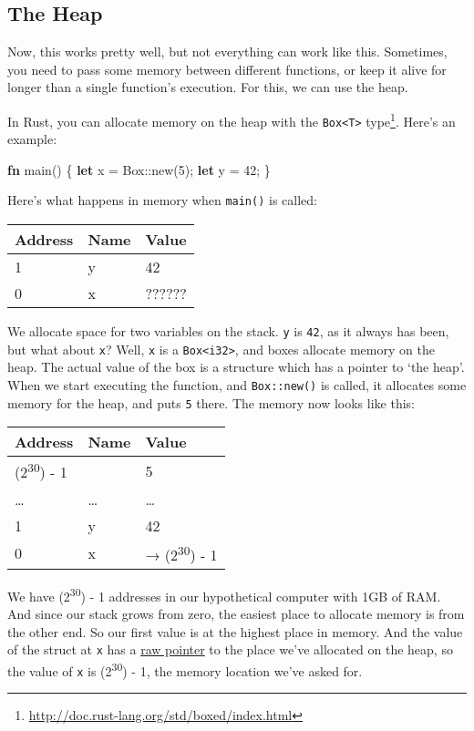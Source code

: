 \documentclass[a4paper,]{book}
\newenvironment{Shaded}{\begin{snugshade}}{\end{snugshade}}
\newcommand{\KeywordTok}[1]{\textcolor[rgb]{0.13,0.29,0.53}{\textbf{{#1}}}}
\newcommand{\DataTypeTok}[1]{\textcolor[rgb]{0.13,0.29,0.53}{{#1}}}
\newcommand{\DecValTok}[1]{\textcolor[rgb]{0.00,0.00,0.81}{{#1}}}
\newcommand{\NormalTok}[1]{{#1}}
\renewcommand{\href}[2]{#2\footnote{\url{#1}}}
\begin{document}
\subsection{The Heap}\label{the-heap}

Now, this works pretty well, but not everything can work like this.
Sometimes, you need to pass some memory between different functions, or
keep it alive for longer than a single function's execution. For this,
we can use the heap.

In Rust, you can allocate memory on the heap with the
\href{http://doc.rust-lang.org/std/boxed/index.html}{\texttt{Box\textless{}T\textgreater{}}
type}. Here's an example:

\begin{Shaded}
\begin{Highlighting}[]
\KeywordTok{fn} \NormalTok{main() \{}
    \KeywordTok{let} \NormalTok{x = }\DataTypeTok{Box}\NormalTok{::new(}\DecValTok{5}\NormalTok{);}
    \KeywordTok{let} \NormalTok{y = }\DecValTok{42}\NormalTok{;}
\NormalTok{\}}
\end{Highlighting}
\end{Shaded}

Here's what happens in memory when \texttt{main()} is called:

\begin{longtable}[c]{@{}lll@{}}
\toprule
Address & Name & Value\tabularnewline
\midrule
\endhead
1 & y & 42\tabularnewline
0 & x & ??????\tabularnewline
\bottomrule
\end{longtable}

We allocate space for two variables on the stack. \texttt{y} is
\texttt{42}, as it always has been, but what about \texttt{x}? Well,
\texttt{x} is a \texttt{Box\textless{}i32\textgreater{}}, and boxes
allocate memory on the heap. The actual value of the box is a structure
which has a pointer to `the heap'. When we start executing the function,
and \texttt{Box::new()} is called, it allocates some memory for the
heap, and puts \texttt{5} there. The memory now looks like this:

\begin{longtable}[c]{@{}lll@{}}
\toprule
Address & Name & Value\tabularnewline
\midrule
\endhead
(2\textsuperscript{30}) - 1 & & 5\tabularnewline
\ldots{} & \ldots{} & \ldots{}\tabularnewline
1 & y & 42\tabularnewline
0 & x & → (2\textsuperscript{30}) - 1\tabularnewline
\bottomrule
\end{longtable}

We have (2\textsuperscript{30}) - 1 addresses in our hypothetical
computer with 1GB of RAM. And since our stack grows from zero, the
easiest place to allocate memory is from the other end. So our first
value is at the highest place in memory. And the value of the struct at
\texttt{x} has a \protect\hyperlink{sec--raw-pointers}{raw pointer} to
the place we've allocated on the heap, so the value of \texttt{x} is
(2\textsuperscript{30}) - 1, the memory location we've asked for.
\end{document}
